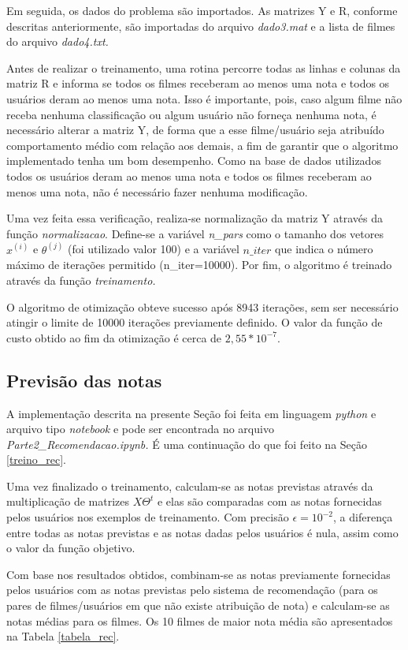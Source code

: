 \documentclass[12pt]{article}
\begin{document}
Em seguida, os dados do problema são importados. As matrizes Y e R, conforme descritas anteriormente, são importadas do arquivo \textit{dado3.mat} e a lista de filmes do arquivo \textit{dado4.txt.}

Antes de realizar o treinamento, uma rotina percorre todas as linhas e colunas da matriz R e informa se todos os filmes receberam ao menos uma nota e todos os usuários deram ao menos uma nota. Isso é importante, pois, caso algum filme não receba nenhuma classificação ou algum usuário não forneça nenhuma nota, é necessário alterar a matriz Y, de forma que a esse filme/usuário seja atribuído comportamento médio com relação aos demais, a fim de garantir que o algoritmo implementado tenha um bom desempenho. Como na base de dados utilizados todos os usuários deram ao menos uma nota e todos os filmes receberam ao menos uma nota, não é necessário fazer nenhuma modificação.

Uma vez feita essa verificação, realiza-se normalização da matriz Y através da função \textit{normalizacao}. Define-se a variável \textit{n\_pars} como o tamanho dos vetores $x^{(i)}$ e $\theta^{(j)}$ (foi utilizado valor 100) e a variável $n\_iter$ que indica o número máximo de iterações permitido (n\_iter=10000). Por fim, o algoritmo é treinado através da função \textit{treinamento.}

O algoritmo de otimização obteve sucesso após 8943 iterações, sem ser necessário atingir o limite de 10000 iterações previamente definido. O valor da função de custo obtido ao fim da otimização é cerca de $2,55 * 10^{-7}$.

\subsection{Previsão das notas} \label{notas_rec}
A implementação descrita na presente Seção foi feita em linguagem \textit{python} e arquivo tipo \textit{notebook} e pode ser encontrada no arquivo \textit{Parte2\_Recomendacao.ipynb.} É uma continuação do que foi feito na Seção \ref{treino_rec}.

Uma vez finalizado o treinamento, calculam-se as notas previstas através da multiplicação de matrizes $X\Theta^t$ e elas são comparadas com as notas fornecidas pelos usuários nos exemplos de treinamento. Com precisão $\epsilon = 10^{-2}$, a diferença entre todas as notas previstas e as notas dadas pelos usuários é nula, assim como o valor da função objetivo.

Com base nos resultados obtidos, combinam-se as notas previamente fornecidas pelos usuários com as notas previstas pelo sistema de recomendação (para os pares de filmes/usuários em que não existe atribuição de nota) e calculam-se as notas médias para os filmes. Os 10 filmes de maior nota média são apresentados na Tabela \ref{tabela_rec}.  
\end{document}
